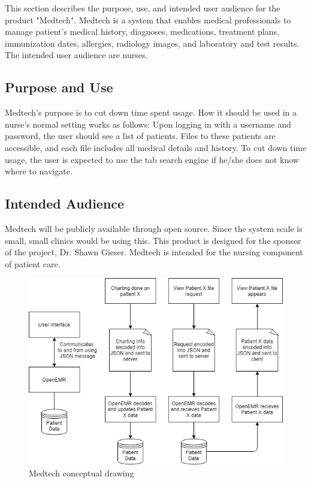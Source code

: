 This section describes the purpose, use, and intended user audience for the product "Medtech". Medtech is a system that enables medical professionals to manage patient's medical history, diagnoses, medications, treatment plans, immunization dates, allergies, radiology images, and laboratory and test results. The intended user audience are nurses.

\subsection{Purpose and Use}
Medtech's purpose is to cut down time spent usage. How it should be used in a nurse's normal setting works as follows: Upon logging in with a username and password, the user should see a list of patients. Files to these patients are accessible, and each file includes all medical details and history. To cut down time usage, the user is expected to use the tab search engine if he/she does not know where to navigate.

\subsection{Intended Audience}
Medtech will be publicly available through open source. Since the system scale is small, small clinics would be using this. This product is designed for the sponsor of the project, Dr. Shawn Gieser. Medtech is intended for the nursing component of patient care.

\begin{figure}[h!]
	\centering
   	\includegraphics[width=1.00\textwidth]{images/Conceptual Diagram.png}
    \caption{Medtech conceptual drawing}
\end{figure}
